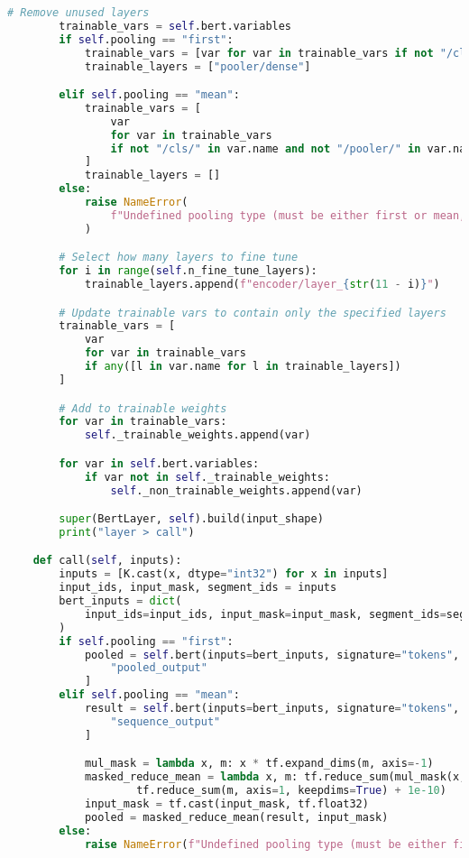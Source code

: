 \begin{lstlisting}[language=Python, caption=My attempt to adapt BERT to short text classification]
        # Remove unused layers
        trainable_vars = self.bert.variables
        if self.pooling == "first":
            trainable_vars = [var for var in trainable_vars if not "/cls/" in var.name]
            trainable_layers = ["pooler/dense"]

        elif self.pooling == "mean":
            trainable_vars = [
                var
                for var in trainable_vars
                if not "/cls/" in var.name and not "/pooler/" in var.name
            ]
            trainable_layers = []
        else:
            raise NameError(
                f"Undefined pooling type (must be either first or mean, but is {self.pooling}"
            )

        # Select how many layers to fine tune
        for i in range(self.n_fine_tune_layers):
            trainable_layers.append(f"encoder/layer_{str(11 - i)}")

        # Update trainable vars to contain only the specified layers
        trainable_vars = [
            var
            for var in trainable_vars
            if any([l in var.name for l in trainable_layers])
        ]

        # Add to trainable weights
        for var in trainable_vars:
            self._trainable_weights.append(var)

        for var in self.bert.variables:
            if var not in self._trainable_weights:
                self._non_trainable_weights.append(var)

        super(BertLayer, self).build(input_shape)
        print("layer > call")

    def call(self, inputs):
        inputs = [K.cast(x, dtype="int32") for x in inputs]
        input_ids, input_mask, segment_ids = inputs
        bert_inputs = dict(
            input_ids=input_ids, input_mask=input_mask, segment_ids=segment_ids
        )
        if self.pooling == "first":
            pooled = self.bert(inputs=bert_inputs, signature="tokens", as_dict=True)[
                "pooled_output"
            ]
        elif self.pooling == "mean":
            result = self.bert(inputs=bert_inputs, signature="tokens", as_dict=True)[
                "sequence_output"
            ]

            mul_mask = lambda x, m: x * tf.expand_dims(m, axis=-1)
            masked_reduce_mean = lambda x, m: tf.reduce_sum(mul_mask(x, m), axis=1) / (
                    tf.reduce_sum(m, axis=1, keepdims=True) + 1e-10)
            input_mask = tf.cast(input_mask, tf.float32)
            pooled = masked_reduce_mean(result, input_mask)
        else:
            raise NameError(f"Undefined pooling type (must be either first or mean, but is {self.pooling}")


\end{lstlisting}
